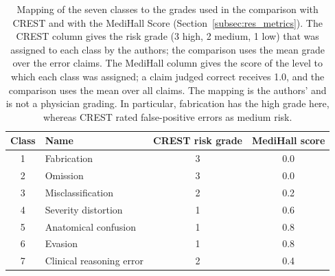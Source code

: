 \documentclass[11pt,a4paper]{article}
\begin{document}
\begin{appendices}
\begin{table}[tbp]
\centering
\small
\caption{Mapping of the seven classes to the grades used in the comparison with CREST and with the MediHall Score (Section~\ref{subsec:res_metrics}). The CREST column gives the risk grade (3 high, 2 medium, 1 low) that was assigned to each class by the authors; the comparison uses the mean grade over the error claims. The MediHall column gives the score of the level to which each class was assigned; a claim judged correct receives 1.0, and the comparison uses the mean over all claims. The mapping is the authors' and is not a physician grading. In particular, fabrication has the high grade here, whereas CREST rated false-positive errors as medium risk.}
\label{tab:mapping}
\begin{tabular}{@{}clcc@{}}
\toprule
Class & Name & CREST risk grade & MediHall score \\
\midrule
1 & Fabrication & 3 & 0.0 \\
2 & Omission & 3 & 0.0 \\
3 & Misclassification & 2 & 0.2 \\
4 & Severity distortion & 1 & 0.6 \\
5 & Anatomical confusion & 1 & 0.8 \\
6 & Evasion & 1 & 0.8 \\
7 & Clinical reasoning error & 2 & 0.4 \\
\bottomrule
\end{tabular}
\end{table}

\end{appendices}
\end{document}
